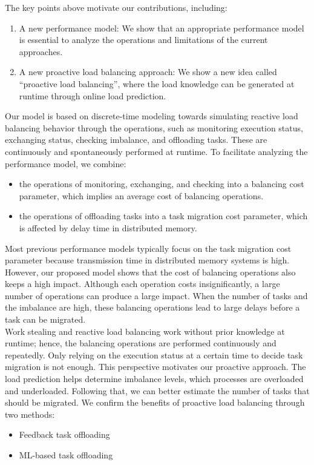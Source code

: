 
The key points above motivate our contributions, including:
\begin{enumerate}
	\item A new performance model: We show that an appropriate performance model is essential to analyze the operations and limitations of the current approaches.
	\item A new proactive load balancing approach: We show a new idea called ``proactive load balancing'', where the load knowledge can be generated at runtime through online load prediction.
\end{enumerate}

Our model is based on discrete-time modeling towards simulating reactive load balancing behavior through the operations, such as monitoring execution status, exchanging status, checking imbalance, and offloading tasks. These are continuously and spontaneously performed at runtime. To facilitate analyzing the performance model, we combine:
\begin{itemize}
	\item the operations of monitoring, exchanging, and checking into a balancing cost parameter, which implies an average cost of balancing operations.
	\item the operations of offloading tasks into a task migration cost parameter, which is affected by delay time in distributed memory.
\end{itemize}

Most previous performance models typically focus on the task migration cost parameter because transmission time in distributed memory systems is high. However, our proposed model shows that the cost of balancing operations also keeps a high impact. Although each operation costs insignificantly, a large number of operations can produce a large impact. When the number of tasks and the imbalance are high, these balancing operations lead to large delays before a task can be migrated.\\

Work stealing and reactive load balancing work without prior knowledge at runtime; hence, the balancing operations are performed continuously and repeatedly. Only relying on the execution status at a certain time to decide task migration is not enough. This perspective motivates our proactive approach. The load prediction helps determine imbalance levels, which processes are overloaded and underloaded. Following that, we can better estimate the number of tasks that should be migrated. We confirm the benefits of proactive load balancing through two methods:
\begin{itemize}
	\item Feedback task offloading
	\item ML-based task offloading
\end{itemize}

